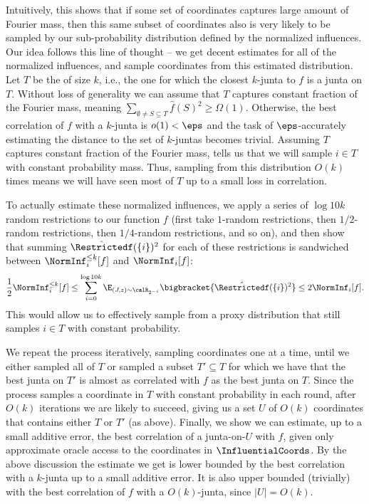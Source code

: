 Intuitively, this shows that if some set of coordinates captures large amount of Fourier mass, then this same subset of coordinates also is very likely to be sampled by our sub-probability distribution defined by the normalized influences. Our idea follows this line of thought -- we get decent estimates for all of the normalized influences, and sample coordinates from this estimated distribution. 
%
Let $T$ be the  of size $k$, i.e., the one for which the closest $k$-junta to $f$ is a junta on $T$.
Without loss of generality we can assume that $T$ captures constant fraction of the Fourier mass, meaning $\sum_{\emptyset \neq S \subseteq T}\hat{f}(S)^2\ge \Omega(1)$. Otherwise, the best correlation of $f$ with a $k$-junta is $o(1) < \eps$ and the task of $\eps$-accurately estimating the distance to the set of $k$-juntas becomes trivial.
Assuming  $T$ captures constant fraction of the Fourier mass,   tells us that we will sample $i \in T$ with constant probability mass. Thus, sampling from this distribution $O(k)$ times means we will have seen most of $T$ up to a small loss in correlation. 

To actually estimate these normalized influences, we apply a series of $\log 10k$ random restrictions to our function $f$ (first take $1$-random restrictions, then $1/2$-random restrictions, then $1/4$-random restrictions, and so on), and then show that summing $\hat{\Restrictedf}(\{i\})^2$ for each of these restrictions is sandwiched between $\NormInf_i^{\leq k}[f]$ and $\NormInf_i[f]$:
$$\frac{1}{2}\NormInf_i^{\leq k}[f] \leq \sum_{i=0}^{\log 10k} \E_{(J,z) \sim \calR_{2^{-i}}}\bigbracket{\hat{\Restrictedf}(\{i\})^2} \leq 2\NormInf_i[f].$$ 
This would allow us to effectively sample from a proxy distribution that still samples  $i \in T$  with constant probability.


%
We repeat the process iteratively, sampling coordinates one at a time, until we either sampled all of $T$ or sampled a subset $T' \subseteq T$ for which we have that the best junta on $T'$ is almost as correlated with $f$ as the best junta on $T$. Since the process samples a coordinate in $T$ with constant probability in each round, after $O(k)$ iterations we are likely to succeed, giving us a set $U$ of $O(k)$ coordinates that contains either $T$ or $T'$ (as above).
Finally, we show we can estimate, up to a small additive error, the best correlation of a junta-on-$U$ with $f$, given only approximate oracle access to the coordinates in $\InfluentialCoords$. By the above discussion the estimate we get is lower bounded by the best correlation with a $k$-junta up to a small additive error. It is also upper bounded (trivially) with the best correlation of $f$ with a $O(k)$-junta, since $|U| = O(k)$.

